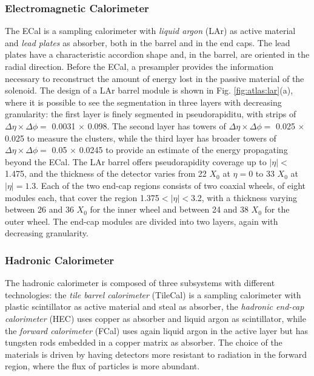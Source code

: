 \subsubsection*{Electromagnetic Calorimeter}

The ECal is a sampling calorimeter with \textit{liquid argon} (LAr) as active material and \textit{lead plates} as absorber, both in the barrel and in the end caps. The lead plates have a characteristic accordion shape and, in the barrel, are oriented in the radial direction. Before the ECal, a presampler provides the information necessary to reconstruct the amount of energy lost in the passive material of the solenoid. The design of a LAr barrel module is shown in Fig. \ref{fig:atlas:lar}(a), where it is possible to see the segmentation in three layers with decreasing granularity: the first layer is finely segmented in pseudorapiditu, with strips of $\Delta\eta \times \Delta\phi = $ 0.0031 $\times$ 0.098. The second layer has towers of $\Delta\eta \times \Delta\phi = $ 0.025 $\times$ 0.025 to measure the clusters, while the third layer has broader towers of $\Delta\eta \times \Delta\phi = $ 0.05 $\times$ 0.0245 to provide an estimate of the energy propagating beyond the ECal. The LAr barrel offers pseudorapidity coverage up to $|\eta|<$1.475, and the thickness of the detector varies from 22 $X_0$ at $\eta=0$ to 33 $X_0$ at $|\eta|=1.3$. 
Each of the two end-cap regions consists of two coaxial wheels, of eight modules each, that cover the region 1.375$<|\eta|<$3.2, with a thickness varying between 26 and 36 $X_0$ for the inner wheel and between 24 and 38 $X_0$ for the outer wheel. The end-cap modules are divided into two layers, again with decreasing granularity.


\subsubsection*{Hadronic Calorimeter}

The hadronic calorimeter is composed of three subsystems with different technologies: the \textit{tile barrel calorimeter} (TileCal) \cite{TileTDR} is a sampling calorimeter with plastic scintillator as active material and steal as absorber, the \textit{hadronic end-cap calorimeter} (HEC) uses copper as absorber and liquid argon as scintillator, while the \textit{forward calorimeter} (FCal) uses again liquid argon in the active layer but has tungsten rods embedded in a copper matrix as absorber. The choice of the materials is driven by having detectors more resistant to radiation in the forward region, where the flux of particles is more abundant. 

